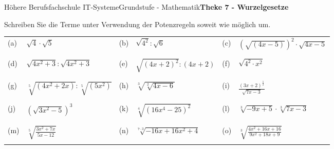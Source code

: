 \documentclass[oneside,openany,headings=optiontotoc,11pt,numbers=noenddot]{scrreprt}
\begin{document}
	\begin{worksheet}{Höhere Berufsfachschule IT-Systeme}{Grundstufe - Mathematik}{\textbf{Theke 7 - Wurzelgesetze}}
		\begin{framed}
			\noindent
			Schreiben Sie die Terme unter Verwendung der Potenzregeln soweit wie möglich um.\\
			\begin{tabularx}{\textwidth}{lXlXlX}
				\\
				(a) & \(\sqrt{4}\cdot\sqrt{5}\) & (b) & \(\sqrt{4^2}:\sqrt{6}\) & (c) & \((\sqrt{(4x-5)})^2\cdot\sqrt{4x-5}\)\\
				\\
				\hline
				\\
				(d) & \(\sqrt{4x^2+3}:\sqrt{4x^2+3}\) & (e) & \(\sqrt{(4x+2)^2}:(4x+2)\) & (f) & \(\sqrt{4^2\cdot{}x^2}\)\\
				\\
				\hline
				\\
				(g) & \(\sqrt[5]{(4x^2+2x)}:\sqrt[5]{(5x^2)}\) & (h) & \(\sqrt[3]{\sqrt[2]{4x-6}}\) & (i) & \(\frac{(3x+2)^{\frac{1}{2}}}{\sqrt{7x-3}}\)\\
				\\
				\hline
				\\
				(j) & \((\sqrt{3x^2-5})^3\) & (k) & \(\sqrt[4]{(16x^4-25)^2}\) & (l) & \(\sqrt[3]{-9x+5}\cdot\sqrt[3]{7x-3}\)\\
				\\
				\hline
				\\
				(m) & \(\sqrt[5]{\frac{3x^2+7x}{5x-12}}\) & (n) & \(\sqrt[7\cdot{}3]{-16x+16x^2+4}\) & (o) & \(\sqrt[3]{\frac{4x^2+16x +16}{9x^2 + 18x + 9}}\)\\
				\\
				\hline
			\end{tabularx}
		\end{framed}
	\end{worksheet}
\end{document}
